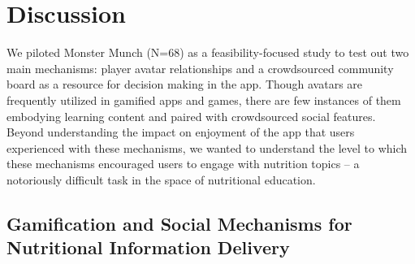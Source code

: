 \vspace{-5pt}
\section{Discussion}



We piloted Monster Munch (N=68) as a feasibility-focused study to test out two main mechanisms: player avatar relationships and a crowdsourced community board as a resource for decision making in the app. Though avatars are frequently utilized in gamified apps and games, there are few instances of them embodying learning content and paired with crowdsourced social features. Beyond understanding the impact on enjoyment of the app that users experienced with these mechanisms, we wanted to understand the level to which these mechanisms encouraged users to engage with nutrition topics -- a notoriously difficult task in the space of nutritional education.











\vspace{-5pt}
\subsection{Gamification and Social Mechanisms for Nutritional Information Delivery}




